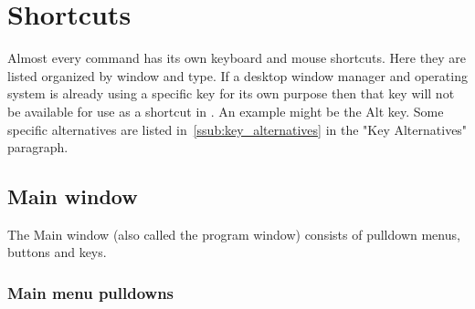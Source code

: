 \chapter{Shortcuts}%
\label{cha:shortcuts}

Almost every \CGGI{} command has its own keyboard and mouse shortcuts. Here
they are listed organized by window and type.  If a desktop window manager and operating
system is already using a specific key for its own purpose then that key will not be available
for use as a shortcut in \CGG{}. An example might be the Alt key. Some specific alternatives
are listed in~\ref{ssub:key_alternatives} in the "Key Alternatives" paragraph.

\section{Main window }%
\label{sec:main_window}

The Main window (also called the program window) consists of pulldown menus, buttons and keys.

\subsection*{Main menu pulldowns}%
\label{sub:main_menu_pulldowns}

\renewcommand{\arraystretch}{1.15}%

